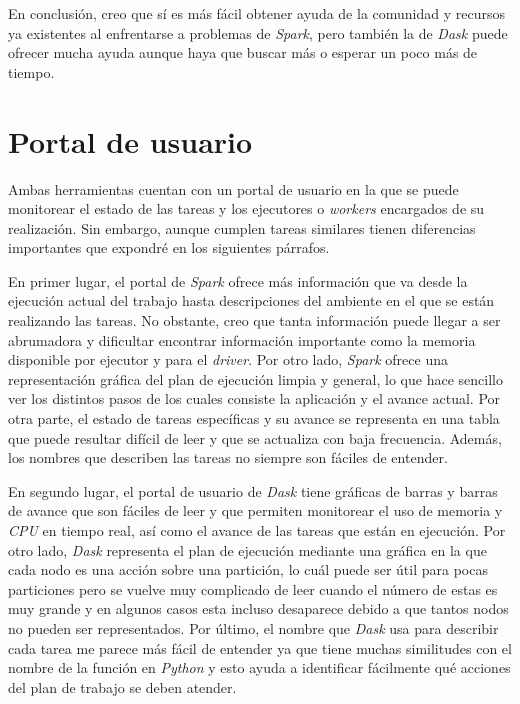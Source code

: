En conclusión, creo que sí es más fácil obtener ayuda de la comunidad y recursos ya existentes al enfrentarse a problemas de \textit{Spark}, pero también la de \textit{Dask} puede ofrecer mucha ayuda aunque haya que buscar más o esperar un poco más de tiempo.

\section{Portal de usuario}

Ambas herramientas cuentan con un portal de usuario en la que se puede monitorear el estado de las tareas y los ejecutores o \textit{workers} encargados de su realización. Sin embargo, aunque cumplen tareas similares tienen diferencias importantes que expondré en los siguientes párrafos.

En primer lugar, el portal de \textit{Spark} ofrece más información que va desde la ejecución actual del trabajo hasta descripciones del ambiente en el que se están realizando las tareas. No obstante, creo que tanta información puede llegar a ser abrumadora y dificultar encontrar información importante como la memoria disponible por ejecutor y para el \textit{driver}. Por otro lado, \textit{Spark} ofrece una representación gráfica del plan de ejecución limpia y general, lo que hace sencillo ver los distintos pasos de los cuales consiste la aplicación y el avance actual. Por otra parte, el estado de tareas específicas y su avance se representa en una tabla que puede resultar difícil de leer y que se actualiza con baja frecuencia. Además, los nombres que describen las tareas no siempre son fáciles de entender.

En segundo lugar, el portal de usuario de \textit{Dask} tiene gráficas de barras y barras de avance que son fáciles de leer y que permiten monitorear el uso de memoria y \textit{CPU} en tiempo real, así como el avance de las tareas que están en ejecución. Por otro lado, \textit{Dask} representa el plan de ejecución mediante una gráfica en la que cada nodo es una acción sobre una partición, lo cuál puede ser útil para pocas particiones pero se vuelve muy complicado de leer cuando el número de estas es muy grande y en algunos casos esta incluso desaparece debido a que tantos nodos no pueden ser representados. Por último, el nombre que \textit{Dask} usa para describir cada tarea me parece más fácil de entender ya que tiene muchas similitudes con el nombre de la función en \textit{Python} y esto ayuda a identificar fácilmente qué acciones del plan de trabajo se deben atender.

